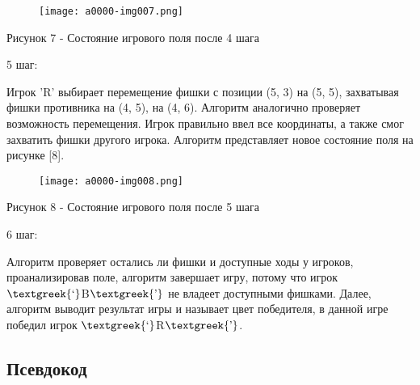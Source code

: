 \documentclass[a4paper]{article}
\begin{document}
\begin{figure}[h]
    \centering
    \texttt{[image: a0000-img007.png]}
    \end{figure} 
\par
{\centering
Рисунок 7 - Состояние игрового поля после 4 шага
\par}

5 шаг:

Игрок 'R' выбирает перемещение фишки с позиции (5, 3) на (5, 5), захватывая фишки противника на (4, 5), на (4, 6).
Алгоритм аналогично проверяет возможность перемещения. Игрок правильно ввел все координаты,
а также смог захватить фишки другого игрока. Алгоритм представляет новое состояние поля на рисунке [8].


\begin{figure}[h]
    \centering
    \texttt{[image: a0000-img008.png]}
    \end{figure} 
\par
{\centering
Рисунок 8 - Состояние игрового поля после 5 шага
\par}

6 шаг:

Алгоритм проверяет остались ли фишки и доступные ходы у игроков, проанализировав поле, алгоритм завершает игру, потому
что игрок $\text{\textgreek{‘}}$B$\text{\textgreek{’}}$ не владеет доступными фишками. Далее, алгоритм выводит
результат игры и называет цвет победителя, в данной игре победил игрок $\text{\textgreek{‘}}$R$\text{\textgreek{’}}$.

\newpage
\begin{center}
   \subsection{Псевдокод}
\end{center}
\end{document}
